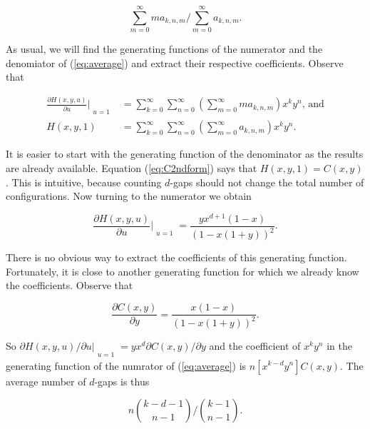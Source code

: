 \documentclass{article}
\begin{document}
\begin{equation}
\label{eq:average}
\sum_{m=0}^\infty ma_{k,n,m}\Big/\sum_{m=0}^\infty a_{k,n,m}.
\end{equation}

As usual, we will find the generating functions of the numerator and the
denomiator of (\ref{eq:average}) and extract their respective
coefficients. Observe that

\begin{equation*}
\begin{split}
\frac{\partial H(x,y,u)}{\partial u}\Bigr|_{\substack{\\u=1}} &=
\sum_{k=0}^\infty\sum_{n=0}^\infty
\left(\sum_{m=0}^\infty ma_{k,n,m}\right) x^ky^n \text{, and} \\
H(x,y,1) &= \sum_{k=0}^\infty\sum_{n=0}^\infty
\left(\sum_{m=0}^\infty a_{k,n,m} \right)x^ky^n.
\end{split}
\end{equation*}

It is easier to start with the generating function of the denominator as
the results are already available. Equation (\ref{eq:C2ndform}) says that
$H(x,y,1) = C(x,y)$. This is intuitive, because counting $d$-gaps should
not change the total number of configurations. Now turning to the
numerator we obtain

\begin{equation*}
\frac{\partial H(x,y,u)}{\partial u}\Bigr|_{\substack{\\u=1}}
= \frac{yx^{d+1}(1-x)}{\left(1-x(1+y)\right)^2}.
\end{equation*}

There is no obvious way to extract the coefficients of this generating
function. Fortunately, it is close to another generating function for
which we already know the coefficients. Observe that

\begin{equation*}
\frac{\partial C(x,y)}{\partial y} = 
\frac{x(1-x)}{\left(1-x(1+y)\right)^2}.
\end{equation*}

So $\partial H(x,y,u)/\partial u|_{\substack{\\u=1}} = yx^d\partial
C(x,y)/\partial y$ and the coefficient of $x^ky^n$ in the generating
function of the numrator of (\ref{eq:average}) is $n[x^{k-d}y^n]C(x,y)$.
The average number of $d$-gaps is thus

\begin{equation*}
n {k-d-1 \choose n-1} \Big/ {k-1 \choose n-1}.
\end{equation*}
\end{document}
